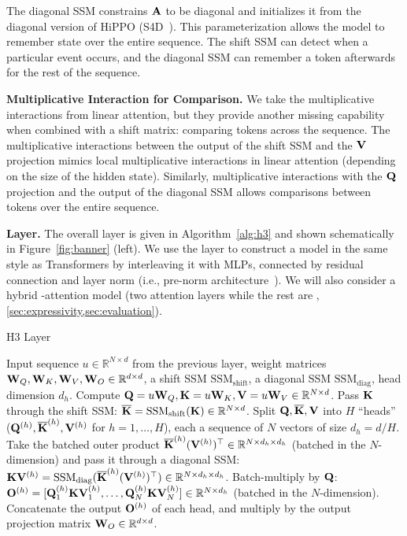 The diagonal SSM constrains $\mathbf{A}$ to be diagonal and initializes it from the diagonal version of HiPPO (S4D~\citep{gu2022parameterization}).
This parameterization allows the model to remember state over the entire sequence.
The shift SSM can detect when a particular event occurs, and the diagonal SSM can remember a token afterwards for the rest of the sequence.

\textbf{Multiplicative Interaction for Comparison.}
We take the multiplicative interactions from linear attention, but they provide another missing capability when combined with a shift matrix: comparing tokens across the sequence.
The multiplicative interactions between the output of the shift SSM and the $\mathbf{V}$ projection mimics local multiplicative interactions in linear attention (depending on the size of the hidden state).
Similarly, multiplicative interactions with the $\mathbf{Q}$ projection and the output of the diagonal SSM allows comparisons between tokens over the entire sequence.

\textbf{\hthree Layer.} The overall layer is given in Algorithm~\ref{alg:h3} and shown schematically in Figure~\ref{fig:banner} (left).
We use the \hthree layer to construct a model in the same style as Transformers by interleaving it with MLPs,
connected by residual connection and layer norm (i.e., pre-norm architecture~\citep{baevski2018adaptive}).
We will also consider a hybrid \hthree-attention model (two attention layers while the rest are \hthree, \cref{sec:expressivity,sec:evaluation}).
\begin{algorithm}[H]
  \caption{\label{alg:h3} H3 Layer}
  \small
  \begin{algorithmic}[1]
    \REQUIRE Input sequence $u \in \mathbb{R}^{N \times d}$ from the previous layer, weight
    matrices $\mathbf{W}_Q, \mathbf{W}_K, \mathbf{W}_V, \mathbf{W}_O \in \mathbb{R}^{d \times d}$, a shift SSM $\mathrm{SSM}_\mathrm{shift}$, a diagonal SSM $\mathrm{SSM}_{\mathrm{diag}}$, head dimension $d_h$.
    \STATE Compute $\mathbf{Q} = u \mathbf{W}_Q, \mathbf{K} = u \mathbf{W}_K, \mathbf{V} = u \mathbf{W}_V \in \mathbb{R}^{N \times d}$.
    \STATE Pass $\mathbf{K}$ through the shift SSM: $\overline{\mathbf{K}} = \mathrm{SSM}_\mathrm{shift}(\mathbf{K}) \in \mathbb{R}^{N \times d}$.
    \STATE Split $\mathbf{Q}, \overline{\mathbf{K}}, \mathbf{V}$ into $H$ ``heads'' ($\mathbf{Q}^{(h)}, {\overline{\mathbf{K}}}^{(h)}, \mathbf{V}^{(h)}$
    for $h = 1, \dots, H$), each a sequence of $N$ vectors of size $d_{h} = d / H$.
    \STATE Take the batched outer product ${\overline{\mathbf{K}}}^{(h)} (\mathbf{V}^{(h)})^\top \in \mathbb{R}^{N \times d_h \times d_h}$ (batched in the $N$-dimension) and pass it through a diagonal SSM: $\mathbf{K}\mathbf{V}^{(h)} = \mathrm{SSM}_{\mathrm{diag}}({\overline{\mathbf{K}}}^{(h)} (\mathbf{V}^{(h)})^\top) \in \mathbb{R}^{N \times d_{h} \times {d_{h}}}$.
    \STATE Batch-multiply by $\mathbf{Q}$:  $\mathbf{O}^{(h)} = [\mathbf{Q}^{(h)}_1 \mathbf{K}\mathbf{V}^{(h)}_1, \dots, \mathbf{Q}^{(h)}_N \mathbf{K}\mathbf{V}^{(h)}_N]\in  \mathbb{R}^{N \times d_h}$ (batched in the $N$-dimension).
    \ENDFOR
    \STATE Concatenate the output $\mathbf{O}^{(h)}$ of each head, and multiply by the output
    projection matrix $\mathbf{W}_O \in \mathbb{R}^{d \times d}$.
  \end{algorithmic}
\end{algorithm}

